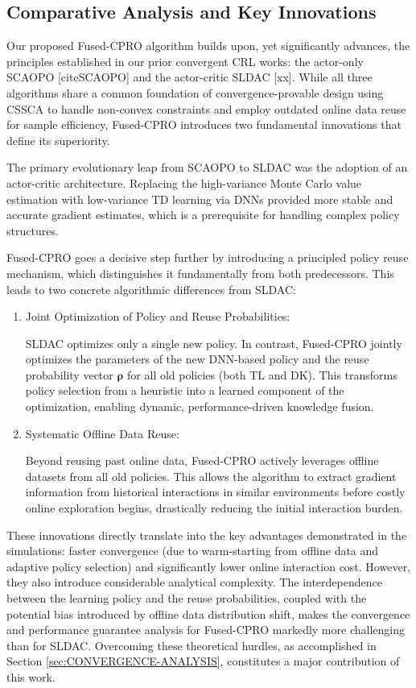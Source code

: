 \documentclass{IEEEtran}
\begin{document}
\subsection{Comparative Analysis and Key Innovations}
Our proposed Fused-CPRO algorithm builds upon, yet significantly advances, the principles established in our prior convergent CRL works: the actor-only SCAOPO [citeSCAOPO] and the actor-critic SLDAC [xx]. While all three algorithms share a common foundation of convergence-provable design using CSSCA to handle non-convex constraints and employ outdated online data reuse for sample efficiency, Fused-CPRO introduces two fundamental innovations that define its superiority.

The primary evolutionary leap from SCAOPO to SLDAC was the adoption of an actor-critic architecture. Replacing the high-variance Monte Carlo value estimation with low-variance TD learning via DNNs provided more stable and accurate gradient estimates, which is a prerequisite for handling complex policy structures.

Fused-CPRO goes a decisive step further by introducing a principled policy reuse mechanism, which distinguishes it fundamentally from both predecessors. This leads to two concrete algorithmic differences from SLDAC:

\begin{enumerate}
\item Joint Optimization of Policy and Reuse Probabilities:

SLDAC optimizes only a single new policy. In contrast, Fused-CPRO jointly optimizes the parameters of the new DNN-based policy and the reuse probability vector $\boldsymbol{\rho}$ for all old policies (both TL and DK). This transforms policy selection from a heuristic into a learned component of the optimization, enabling dynamic, performance-driven knowledge fusion.
\item Systematic Offline Data Reuse:

Beyond reusing past online data, Fused-CPRO actively leverages offline datasets from all old policies. This allows the algorithm to extract gradient information from historical interactions in similar environments before costly online exploration begins, drastically reducing the initial interaction burden.
\end{enumerate}

These innovations directly translate into the key advantages demonstrated in the simulations: faster convergence (due to warm-starting from offline data and adaptive policy selection) and significantly lower online interaction cost. However, they also introduce considerable analytical complexity. The interdependence between the learning policy and the reuse probabilities, coupled with the potential bias introduced by offline data distribution shift, makes the convergence and performance guarantee analysis for Fused-CPRO markedly more challenging than for SLDAC. Overcoming these theoretical hurdles, as accomplished in Section \ref{sec:CONVERGENCE-ANALYSIS}, constitutes a major contribution of this work.
\end{document}
